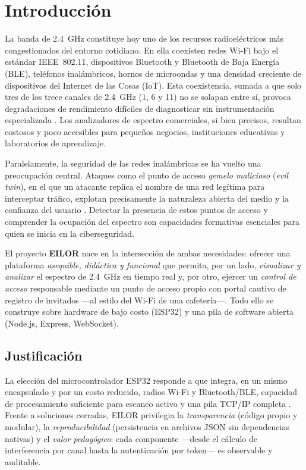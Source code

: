 \chapter{Introducción}
\label{cap:introduccion}

La banda de 2.4~GHz constituye hoy uno de los recursos radioeléctricos más congestionados del entorno cotidiano. En ella coexisten redes Wi\nobreakdash-Fi bajo el estándar IEEE~802.11, dispositivos Bluetooth y Bluetooth de Baja Energía (BLE), teléfonos inalámbricos, hornos de microondas y una densidad creciente de dispositivos del Internet de las Cosas (IoT). Esta coexistencia, sumada a que solo tres de los trece canales de 2.4~GHz (1, 6 y 11) no se solapan entre sí, provoca degradaciones de rendimiento difíciles de diagnosticar sin instrumentación especializada \parencite{gast2005,bianchi2000}. Los analizadores de espectro comerciales, si bien precisos, resultan costosos y poco accesibles para pequeños negocios, instituciones educativas y laboratorios de aprendizaje.

Paralelamente, la seguridad de las redes inalámbricas se ha vuelto una preocupación central. Ataques como el punto de acceso \emph{gemelo malicioso} (\emph{evil twin}), en el que un atacante replica el nombre de una red legítima para interceptar tráfico, explotan precisamente la naturaleza abierta del medio y la confianza del usuario \parencite{callegati2009,owasp2021}. Detectar la presencia de estos puntos de acceso y comprender la ocupación del espectro son capacidades formativas esenciales para quien se inicia en la ciberseguridad.

El proyecto \textbf{EILOR} nace en la intersección de ambas necesidades: ofrecer una plataforma \emph{asequible, didáctica y funcional} que permita, por un lado, \emph{visualizar y analizar} el espectro de 2.4~GHz en tiempo real y, por otro, ejercer un \emph{control de acceso} responsable mediante un punto de acceso propio con portal cautivo de registro de invitados ---al estilo del Wi\nobreakdash-Fi de una cafetería---. Todo ello se construye sobre hardware de bajo costo (ESP32) y una pila de software abierta (Node.js, Express, WebSocket).

\section{Justificación}
La elección del microcontrolador ESP32 responde a que integra, en un mismo encapsulado y por un costo reducido, radios Wi\nobreakdash-Fi y Bluetooth/BLE, capacidad de procesamiento suficiente para escaneo activo y una pila TCP/IP completa \parencite{espressif2023}. Frente a soluciones cerradas, EILOR privilegia la \emph{transparencia} (código propio y modular), la \emph{reproducibilidad} (persistencia en archivos JSON sin dependencias nativas) y el \emph{valor pedagógico}: cada componente ---desde el cálculo de interferencia por canal hasta la autenticación por token--- es observable y auditable.

